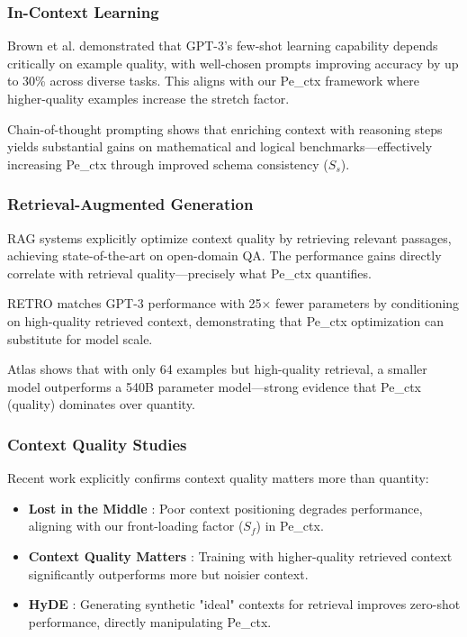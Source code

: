 \documentclass[conference]{IEEEtran}
\begin{document}
\subsubsection{In-Context Learning}

Brown et al. \cite{brown2020language} demonstrated that GPT-3's few-shot learning capability depends critically on example quality, with well-chosen prompts improving accuracy by up to 30\% across diverse tasks. This aligns with our Pe\_ctx framework where higher-quality examples increase the stretch factor.

Chain-of-thought prompting \cite{wei2022chain} shows that enriching context with reasoning steps yields substantial gains on mathematical and logical benchmarks—effectively increasing Pe\_ctx through improved schema consistency ($S_s$).

\subsubsection{Retrieval-Augmented Generation}

RAG systems \cite{lewis2020retrieval} explicitly optimize context quality by retrieving relevant passages, achieving state-of-the-art on open-domain QA. The performance gains directly correlate with retrieval quality—precisely what Pe\_ctx quantifies.

RETRO \cite{borgeaud2021retro} matches GPT-3 performance with 25× fewer parameters by conditioning on high-quality retrieved context, demonstrating that Pe\_ctx optimization can substitute for model scale.

Atlas \cite{izacard2023atlas} shows that with only 64 examples but high-quality retrieval, a smaller model outperforms a 540B parameter model—strong evidence that Pe\_ctx (quality) dominates over quantity.

\subsubsection{Context Quality Studies}

Recent work explicitly confirms context quality matters more than quantity:

\begin{itemize}
\item \textbf{Lost in the Middle} \cite{liu2023lost}: Poor context positioning degrades performance, aligning with our front-loading factor ($S_f$) in Pe\_ctx.
\item \textbf{Context Quality Matters} \cite{contextquality2024}: Training with higher-quality retrieved context significantly outperforms more but noisier context.
\item \textbf{HyDE} \cite{gao2023hyde}: Generating synthetic "ideal" contexts for retrieval improves zero-shot performance, directly manipulating Pe\_ctx.
\end{itemize}
\end{document}
